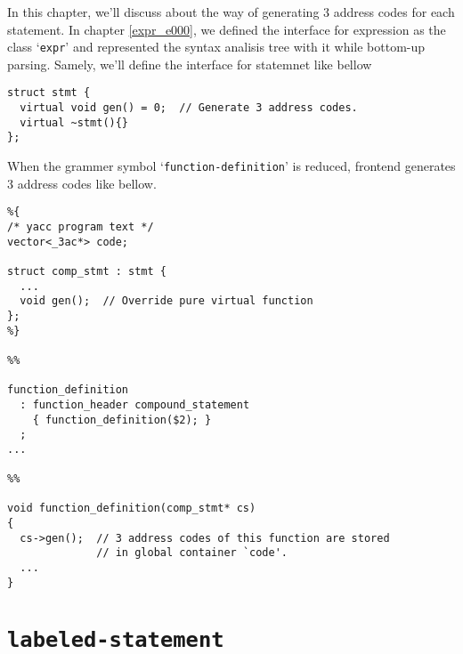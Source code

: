 \label{stmt_e006}
In this chapter, we'll discuss about the way of generating 3 address
codes for each statement. In chapter \ref{expr_e000}, we defined the
interface for expression as the class `{\tt{expr}}' and represented
the syntax analisis tree with it while bottom-up parsing. Samely,
we'll define the interface for statemnet like bellow
\begin{verbatim}
struct stmt {
  virtual void gen() = 0;  // Generate 3 address codes.
  virtual ~stmt(){}
};
\end{verbatim}
When the grammer symbol `{\tt{function-definition}}' is reduced,
frontend generates 3 address codes like bellow.
\begin{verbatim}
%{
/* yacc program text */
vector<_3ac*> code;

struct comp_stmt : stmt {
  ...
  void gen();  // Override pure virtual function
};
%}

%%

function_definition
  : function_header compound_statement
    { function_definition($2); }
  ;
...

%%

void function_definition(comp_stmt* cs)
{
  cs->gen();  // 3 address codes of this function are stored
              // in global container `code'.
  ...
}
\end{verbatim}

\section{{\tt{labeled-statement}}}

